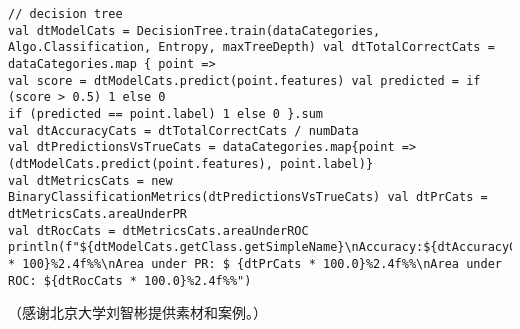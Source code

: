 \begin{lstlisting}
// decision tree
val dtModelCats = DecisionTree.train(dataCategories, Algo.Classification, Entropy, maxTreeDepth) val dtTotalCorrectCats = dataCategories.map { point =>
val score = dtModelCats.predict(point.features) val predicted = if (score > 0.5) 1 else 0
if (predicted == point.label) 1 else 0 }.sum
val dtAccuracyCats = dtTotalCorrectCats / numData
val dtPredictionsVsTrueCats = dataCategories.map{point =>
(dtModelCats.predict(point.features), point.label)}
val dtMetricsCats = new BinaryClassificationMetrics(dtPredictionsVsTrueCats) val dtPrCats = dtMetricsCats.areaUnderPR
val dtRocCats = dtMetricsCats.areaUnderROC
println(f"${dtModelCats.getClass.getSimpleName}\nAccuracy:${dtAccuracyCats * 100}%2.4f%%\nArea under PR: $ {dtPrCats * 100.0}%2.4f%%\nArea under ROC: ${dtRocCats * 100.0}%2.4f%%")
\end{lstlisting}

（感谢北京大学刘智彬提供素材和案例。）
